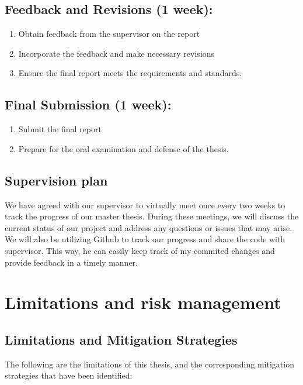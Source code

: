\documentclass[12pt,a4paper,twoside]{article}
\begin{document}
\subsection {Feedback and Revisions (1 week):}
\begin{enumerate}
\item {Obtain feedback from the supervisor on the report}
\item {Incorporate the feedback and make necessary revisions}
\item {Ensure the final report meets the requirements and standards.}
\end{enumerate}

\subsection {Final Submission (1 week):}
\begin{enumerate}
\item {Submit the final report}
\item {Prepare for the oral examination and defense of the thesis.}
\end{enumerate}

\subsection{Supervision plan}

We have agreed with our supervisor to virtually meet once every two weeks to track the progress of our master thesis. During these meetings, we will discuss the current status of our project and address any questions or issues that may arise. We will also be utilizing Github to track our progress and share the code with  supervisor. This way, he can easily keep track of my commited changes and provide feedback in a timely manner.

\section{Limitations and risk management}
\subsection{Limitations and Mitigation Strategies}

The following are the limitations of this thesis, and the corresponding mitigation strategies that have been identified:
\end{document}
